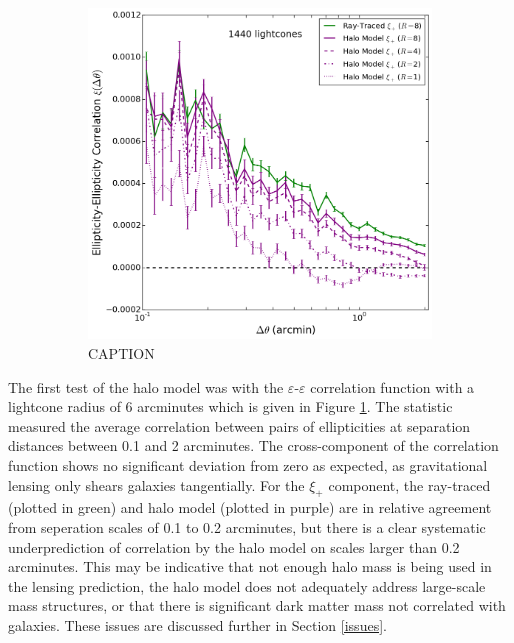 \documentclass[%
 reprint,
 amsmath,amssymb,
 aps,nofootinbib
]{revtex4-1}
\begin{document}
\begin{figure}
\begin{subfigure}{0.475\textwidth}
        \label{fig:gg_corr}
    \end{subfigure}
    ~~
    \begin{subfigure}{0.475\textwidth}
        \includegraphics[width=\textwidth]{figs-swe/thesis/gg_progression.png}
        \captionsetup{justification=raggedright,singlelinecheck=false}
        \caption{CAPTION}
        \label{fig:gg_corr_series}
    \end{subfigure}
    \caption{}
\end{figure}

The first test of the halo model was with the $\varepsilon$-$\varepsilon$ correlation function with a lightcone radius of 6 arcminutes which is given in Figure \ref{fig:gg_corr}. The statistic measured the average correlation between pairs of ellipticities at separation distances between 0.1 and 2 arcminutes. The cross-component of the correlation function shows no significant deviation from zero as expected, as gravitational lensing only shears galaxies tangentially. For the $\xi_+$ component, the ray-traced (plotted in green) and halo model (plotted in purple) are in relative agreement from seperation scales of 0.1 to 0.2 arcminutes, but there is a clear systematic underprediction of correlation by the halo model on scales larger than 0.2 arcminutes. This may be indicative that not enough halo mass is being used in the lensing prediction, the halo model does not adequately address large-scale mass structures, or that there is significant dark matter mass not correlated with galaxies. These issues are discussed further in Section \ref{issues}.
\end{document}
